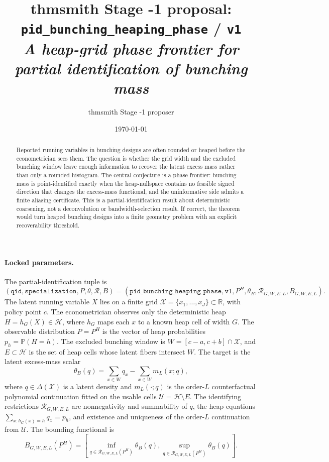 \documentclass[11pt]{article}
\title{thmsmith Stage -1 proposal: \texttt{pid\_bunching\_heaping\_phase} / \texttt{v1}%
  \\ \large\textit{A heap-grid phase frontier for partial identification of bunching mass}}
\author{thmsmith Stage -1 proposer}
\date{\today}
\renewcommand{\Pr}{\mathbb{P}}
\theoremstyle{definition}
\theoremstyle{plain}
\theoremstyle{remark}
\begin{document}
\maketitle


\paragraph{Locked parameters.}
The partial-identification tuple is
\[
(\texttt{qid},\texttt{specialization},P,\theta,\mathcal{R},B)
=
(\texttt{pid\_bunching\_heaping\_phase},\texttt{v1},P^H,\theta_B,
\mathcal{R}_{G,W,E,L},B_{G,W,E,L}).
\]
The latent running variable \(X\) lies on a finite grid \(\mathcal{X}=\{x_1,\ldots,x_J\}\subset\mathbb{R}\), with policy point \(c\).  The econometrician observes only the deterministic heap \(H=h_G(X)\in\mathcal{H}\), where \(h_G\) maps each \(x\) to a known heap cell of width \(G\).  The observable distribution \(P=P^H\) is the vector of heap probabilities \(p_h=\Pr(H=h)\).  The excluded bunching window is \(W=[c-a,c+b]\cap\mathcal{X}\), and \(E\subset\mathcal{H}\) is the set of heap cells whose latent fibers intersect \(W\).  The target is the latent excess-mass scalar
\[
\theta_B(q)=\sum_{x\in W} q_x-\sum_{x\in W} m_L(x;q),
\]
where \(q\in\Delta(\mathcal{X})\) is a latent density and \(m_L(\cdot;q)\) is the order-\(L\) counterfactual polynomial continuation fitted on the usable cells \(\mathcal{U}=\mathcal{H}\setminus E\).  The identifying restrictions \(\mathcal{R}_{G,W,E,L}\) are nonnegativity and summability of \(q\), the heap equations \(\sum_{x:h_G(x)=h}q_x=p_h\), and existence and uniqueness of the order-\(L\) continuation from \(\mathcal{U}\).  The bounding functional is
\[
B_{G,W,E,L}(P^H)=
\left[
\inf_{q\in\mathcal{R}_{G,W,E,L}(P^H)}\theta_B(q),
\sup_{q\in\mathcal{R}_{G,W,E,L}(P^H)}\theta_B(q)
\right].
\]

\begin{abstract}
Reported running variables in bunching designs are often rounded or heaped before the econometrician sees them.  The question is whether the grid width and the excluded bunching window leave enough information to recover the latent excess mass rather than only a rounded histogram.  The central conjecture is a phase frontier: bunching mass is point-identified exactly when the heap-nullspace contains no feasible signed direction that changes the excess-mass functional, and the uninformative side admits a finite aliasing certificate.  This is a partial-identification result about deterministic coarsening, not a deconvolution or bandwidth-selection result.  If correct, the theorem would turn heaped bunching designs into a finite geometry problem with an explicit recoverability threshold.
\end{abstract}
\end{document}

